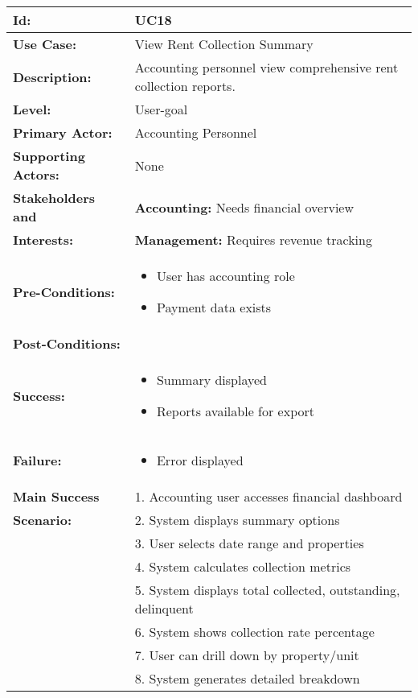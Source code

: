 \documentclass[12pt]{article}
\begin{document}
\begin{tabular}{|p{3cm}|p{11cm}|}
\hline
\textbf{Id:} & UC18 \\
\hline
\textbf{Use Case:} & View Rent Collection Summary \\
\hline
\textbf{Description:} & Accounting personnel view comprehensive rent collection reports. \\
\hline
\textbf{Level:} & User-goal \\
\hline
\textbf{Primary Actor:} & Accounting Personnel \\
\hline
\textbf{Supporting Actors:} & None \\
\hline
\textbf{Stakeholders and} & \textbf{Accounting:} Needs financial overview \\
\textbf{Interests:} & \textbf{Management:} Requires revenue tracking \\
\hline
\textbf{Pre-Conditions:} & 
\begin{itemize}
    \item User has accounting role
    \item Payment data exists
\end{itemize} \\
\hline
\textbf{Post-Conditions:} & \\
\textbf{Success:} & 
\begin{itemize}
    \item Summary displayed
    \item Reports available for export
\end{itemize} \\
\textbf{Failure:} & 
\begin{itemize}
    \item Error displayed
\end{itemize} \\
\hline
\textbf{Main Success} & 1. Accounting user accesses financial dashboard \\
\textbf{Scenario:} & 2. System displays summary options \\
& 3. User selects date range and properties \\
& 4. System calculates collection metrics \\
& 5. System displays total collected, outstanding, delinquent \\
& 6. System shows collection rate percentage \\
& 7. User can drill down by property/unit \\
& 8. System generates detailed breakdown \\

\end{tabular}
\end{document}
